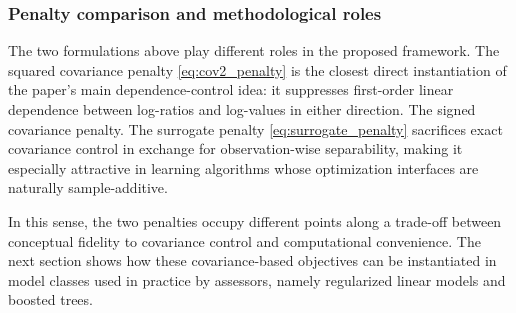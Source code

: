 \documentclass[12pt, draft]{article}
\theoremstyle{plain}
\theoremstyle{definition}
\newcommand{\1}{\mathbf{1}}
\begin{document}
{\subsubsection{Penalty comparison and methodological roles}

The two formulations above play different roles in the proposed framework. The squared covariance penalty \eqref{eq:cov2_penalty} is the closest direct instantiation of the paper's main dependence-control idea: it suppresses first-order linear dependence between log-ratios and log-values in either direction. The signed covariance penalty. The surrogate penalty \eqref{eq:surrogate_penalty} sacrifices exact covariance control in exchange for observation-wise separability, making it especially attractive in learning algorithms whose optimization interfaces are naturally sample-additive.

In this sense, the two penalties occupy different points along a trade-off between conceptual fidelity to covariance control and computational convenience. The next section shows how these covariance-based objectives can be instantiated in model classes used in practice by assessors, namely regularized linear models and boosted trees.






}
\end{document}
